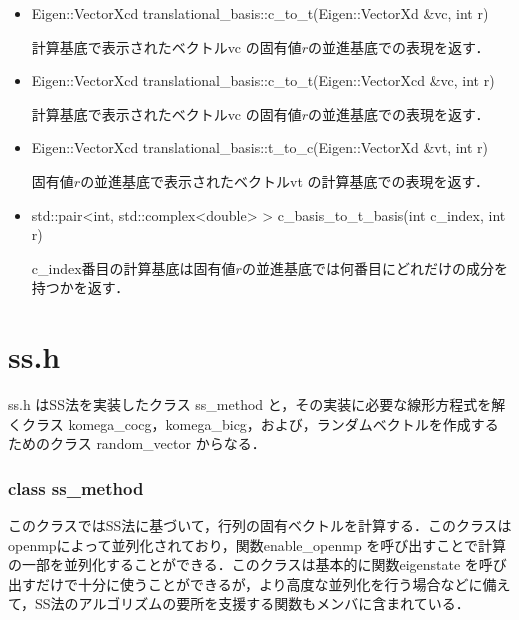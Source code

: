 \documentclass[report, 11pt, uplatex]{jsbook}
\begin{document}
\begin{itemize}
		\item Eigen::VectorXcd translational\_basis::c\_to\_t(Eigen::VectorXd \&vc, int r)
		
		計算基底で表示されたベクトルvc の固有値$r$の並進基底での表現を返す．
		
		\item Eigen::VectorXcd translational\_basis::c\_to\_t(Eigen::VectorXcd \&vc, int r)
		
		計算基底で表示されたベクトルvc の固有値$r$の並進基底での表現を返す．
		
		\item Eigen::VectorXcd translational\_basis::t\_to\_c(Eigen::VectorXd \&vt, int r)
		
		固有値$r$の並進基底で表示されたベクトルvt の計算基底での表現を返す．
		
		\item std::pair<int, std::complex<double> > c\_basis\_to\_t\_basis(int c\_index, int r)
		
		c\_index番目の計算基底は固有値$r$の並進基底では何番目にどれだけの成分を持つかを返す．
		
	\end{itemize}
	
	\section{ss.h}
	ss.h はSS法を実装したクラス ss\_method と，その実装に必要な線形方程式を解くクラス komega\_cocg，komega\_bicg，および，ランダムベクトルを作成するためのクラス random\_vector からなる．
	
	\subsubsection{class ss\_method}
	このクラスではSS法に基づいて，行列の固有ベクトルを計算する．このクラスはopenmpによって並列化されており，関数enable\_openmp を呼び出すことで計算の一部を並列化することができる．このクラスは基本的に関数eigenstate を呼び出すだけで十分に使うことができるが，より高度な並列化を行う場合などに備えて，SS法のアルゴリズムの要所を支援する関数もメンバに含まれている．
	
\end{document}
